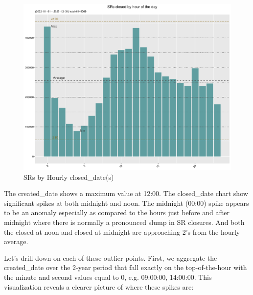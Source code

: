 \documentclass[12pt, titlepage]{article}
\begin{document}
{	\begin{figure}[H]
		 \centering
		 \includegraphics[width = \textwidth]{Closed_Hourly_SR_count.pdf}
		 \caption{SRs by Hourly closed\_date(s)}
		 \label{fig:hourly-closed}
	\end{figure}	
	
	The created\_date shows a maximum value at 12:00. The closed\_date chart show significant spikes at both midnight
	and noon. The midnight (00:00) spike appears to be an anomaly especially as compared to the hours just 
	before and after midnight where there is normally a pronounced slump in SR closures. 
	And both the closed-at-noon and closed-at-midnight are approaching 2\textsigma's from the hourly average. 

	Let's drill down on each of these outlier points. First, we aggregate the created\_date over the 2-year period that fall exactly
	on the top-of-the-hour with the minute and second values equal to 0, e.g. 09:00:00, 14:00:00. This visualization
	reveals a clearer picture of where these spikes are:
	
}
\end{document}
